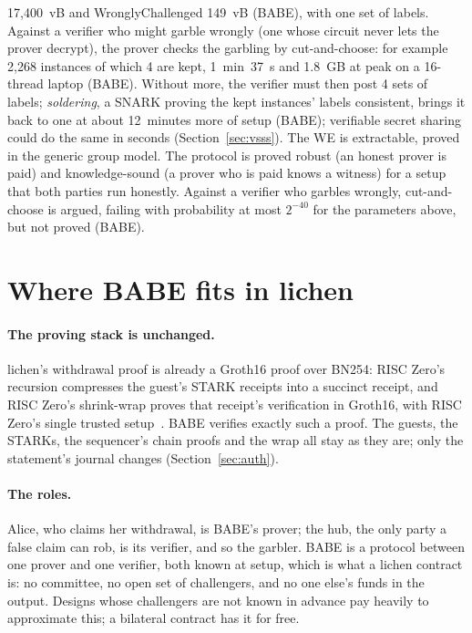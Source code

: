 \documentclass[11pt]{article}
\begin{document}
17,400~vB and WronglyChallenged 149~vB (BABE), with one set of labels.
Against a verifier who might garble wrongly (one whose circuit never lets
the prover decrypt), the prover checks the garbling by cut-and-choose:
for example 2,268 instances of which 4 are kept, 1~min~37~s and 1.8~GB at
peak on a 16-thread laptop (BABE). Without more, the verifier must then
post 4 sets of labels; \emph{soldering}, a SNARK proving the kept
instances' labels consistent, brings it back to one at about 12~minutes
more of setup (BABE); verifiable secret sharing could do the same in
seconds (Section~\ref{sec:vsss}). The WE is extractable, proved in the generic group
model. The protocol is proved robust (an honest prover is paid) and
knowledge-sound (a prover who is paid knows a witness) for a setup that
both parties run honestly. Against a verifier who garbles wrongly,
cut-and-choose is argued, failing with probability at most $2^{-40}$ for
the parameters above, but not proved (BABE).

\section{Where BABE fits in lichen}
\label{sec:fit}

\paragraph{The proving stack is unchanged.} lichen's withdrawal proof is
already a Groth16 proof over BN254: RISC Zero's recursion compresses the
guest's STARK receipts into a succinct receipt, and RISC Zero's
shrink-wrap proves that receipt's verification in Groth16, with RISC
Zero's single trusted setup~\cite{risc0}. BABE verifies exactly such a
proof. The guests, the STARKs, the sequencer's chain proofs and the
wrap all stay as they are; only the statement's journal changes
(Section~\ref{sec:auth}).

\paragraph{The roles.} Alice, who claims her withdrawal, is BABE's
prover; the hub, the only party a false claim can rob, is its verifier,
and so the garbler. BABE is a protocol between one prover and one
verifier, both known at setup, which is what a lichen contract is: no
committee, no open set of challengers, and no one else's funds in the
output. Designs whose challengers are not known in advance pay heavily
to approximate this; a bilateral contract has it for free.
\end{document}
